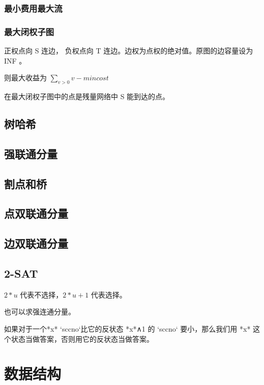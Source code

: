 \documentclass[a4paper]{article}
\begin{document}
\subsubsection{最小费用最大流}

\subsubsection{最大闭权子图}
正权点向 S 连边， 负权点向 T 连边。边权为点权的绝对值。原图的边容量设为 INF 。

则最大收益为 $\sum_{v>0}v-mincost$

在最大闭权子图中的点是残量网络中 S 能到达的点。

\subsection{树哈希}

\subsection{强联通分量}

\subsection{割点和桥}

\subsection{点双联通分量}

\subsection{边双联通分量}

\subsection{2-SAT}

$2 * u$ 代表不选择，$2*u+1$ 代表选择。

也可以求强连通分量。

如果对于一个*x* `sccno`比它的反状态 *x*∧1 的 `sccno` 要小，那么我们用 *x* 这个状态当做答案，否则用它的反状态当做答案。



\section{数据结构}
\end{document}

